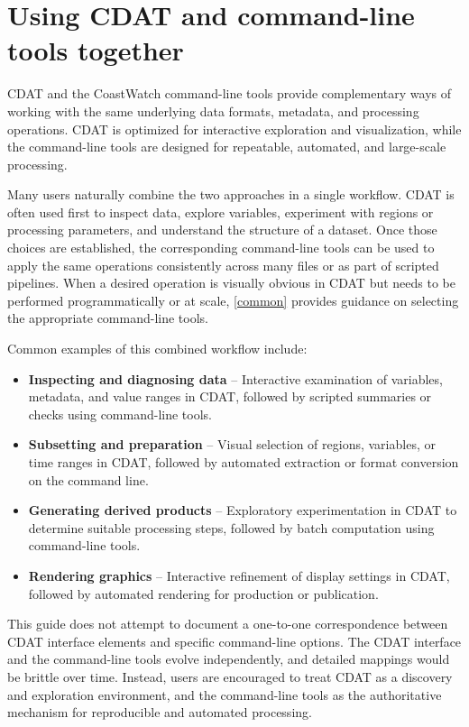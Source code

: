 \section{Using CDAT and command-line tools together}

CDAT and the CoastWatch command-line tools provide complementary ways of working
with the same underlying data formats, metadata, and processing operations.
CDAT is optimized for interactive exploration and visualization, while the
command-line tools are designed for repeatable, automated, and large-scale
processing.

Many users naturally combine the two approaches in a single workflow. CDAT is
often used first to inspect data, explore variables, experiment with regions or
processing parameters, and understand the structure of a dataset. Once those
choices are established, the corresponding command-line tools can be used to
apply the same operations consistently across many files or as part of scripted
pipelines.  When a desired operation is visually obvious in CDAT but needs to 
be performed programmatically or at scale, \autoref{common} provides guidance 
on selecting the appropriate command-line tools.

Common examples of this combined workflow include:
\begin{itemize}
  \item \textbf{Inspecting and diagnosing data} -- Interactive examination of
  variables, metadata, and value ranges in CDAT, followed by scripted summaries
  or checks using command-line tools.
  \item \textbf{Subsetting and preparation} -- Visual selection of regions,
  variables, or time ranges in CDAT, followed by automated extraction or format
  conversion on the command line.
  \item \textbf{Generating derived products} -- Exploratory experimentation in
  CDAT to determine suitable processing steps, followed by batch computation
  using command-line tools.
  \item \textbf{Rendering graphics} -- Interactive refinement of display settings
  in CDAT, followed by automated rendering for production or publication.
\end{itemize}

This guide does not attempt to document a one-to-one correspondence between CDAT
interface elements and specific command-line options. The CDAT interface and the
command-line tools evolve independently, and detailed mappings would be brittle
over time. Instead, users are encouraged to treat CDAT as a discovery and
exploration environment, and the command-line tools as the authoritative
mechanism for reproducible and automated processing.

